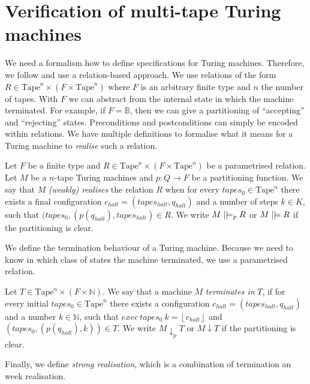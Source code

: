 \documentclass{psartcl}
\newcommand{\from}{:}
\renewcommand{\to}{\rightarrow}
\newcommand{\Bool}{\mathbb{B}}
\newcommand{\Nat}{\mathbb{N}}
\newcommand{\Some}[1]{\left\lfloor #1\right\rfloor}
\newcommand{\Tape}{\txt{Tape}}
\newcommand{\Tapes}[1]{\Tape^{#1}}
\DeclareRobustCommand{\VDash}{\mathrel{||}\joinrel\Relbar}
\newcommand{\txt}[1]{\text{#1}}
\begin{document}
\section{Verification of multi-tape Turing machines}
\label{sec:verification}

We need a formalism how to define specifications for Turing machines.  Therefore, we follow \cite{Asperti} and use a relation-based approach.  We use
relations of the form $R \in \Tapes{n} \times (F \times \Tapes{n})$ where $F$ is an arbitrary finite type and $n$ the number of tapes.  With $F$ we can
abstract from the internal state in which the machine terminated.  For example, if $F = \Bool$, then we can give a partitioning of ``accepting'' and
``rejecting'' states.  Preconditions and postconditions can simply be encoded within relations.  We have multiple definitions to formalise what it
means for a Turing machine to \emph{realise} such a relation.

\begin{definition}
  \label{def:wrealise}
  Let $F$ be a finite type and $R \in \Tapes{n} \times (F \times \Tapes{n})$ be a parametrised relation.  Let $M$ be a $n$-tape Turing machines and
  $p \from Q \to F$ be a partitioning function.  We say that $M$ \emph{(weakly) realises} the relation $R$ when for every $tapes_0 \in \Tapes{n}$
  there exists a final configuration $c_{halt} = (tapes_{halt}, q_{halt})$ and a number of steps $k \in K$, such that
  $(tapes_0, (p(q_{halt}), tapes_{halt}) \in R$.  We write $M \VDash_p R$ or $M \VDash R$ if the partitioning is clear.
\end{definition}

We define the termination behaviour of a Turing machine.  Because we need to know in which class of states the machine terminated, we use a
parametrised relation.

\begin{definition}[Termination]
  \label{def:termination}
  Let $T \in \Tapes{n} \times (F \times \Nat)$.  We say that a machine $M$ \emph{terminates in} $T$, if for every initial $tapes_0 \in \Tapes{n}$
  there exists a configuration $c_{halt} = (tapes_{halt}, q_{halt})$ and a number $k \in \Nat$, such that $exec~tapes_0~k = \Some{c_{halt}}$ and
  $(tapes_0, (p(q_{halt}), k)) \in T$.  We write $M \downarrow_p T$ or $M \downarrow T$ if the partitioning is clear.
\end{definition}

Finally, we define \emph{strong realisation}, which is a combination of termination an week realisation.
\end{document}
